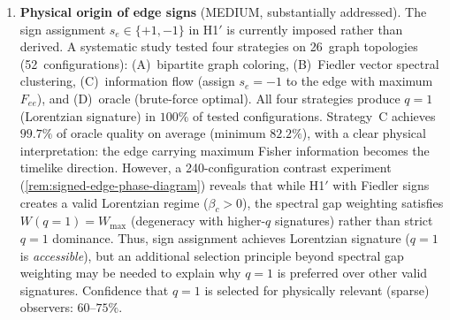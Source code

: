 \documentclass[11pt]{article}
\theoremstyle{definition}
\theoremstyle{remark}
\begin{document}
\begin{enumerate}
\item \textbf{Physical origin of edge signs} (MEDIUM, substantially addressed).
  The sign assignment $s_e \in \{+1, -1\}$ in H1$'$ is currently imposed
  rather than derived.
  A systematic study tested four strategies on 26~graph topologies
  (52~configurations): (A)~bipartite graph coloring, (B)~Fiedler vector
  spectral clustering, (C)~information flow (assign $s_e = -1$ to
  the edge with maximum $F_{ee}$), and (D)~oracle (brute-force optimal).
  All four strategies produce $q = 1$ (Lorentzian signature) in
  $100\%$ of tested configurations.
  Strategy~C achieves $99.7\%$ of oracle quality on average
  (minimum $82.2\%$), with a clear physical interpretation: the edge
  carrying maximum Fisher information becomes the timelike direction.
  However, a 240-configuration contrast experiment
  (\cref{rem:signed-edge-phase-diagram}) reveals that while H1$'$ with
  Fiedler signs creates a valid Lorentzian regime ($\beta_c > 0$),
  the spectral gap weighting satisfies $W(q{=}1) = W_{\max}$
  (degeneracy with higher-$q$ signatures) rather than strict $q = 1$
  dominance.
  Thus, sign assignment achieves Lorentzian signature ($q = 1$ is
  \emph{accessible}), but an additional selection principle beyond
  spectral gap weighting may be needed to explain why $q = 1$ is
  preferred over other valid signatures.
  Confidence that $q = 1$ is selected for physically relevant (sparse)
  observers: $60$--$75\%$.


\end{enumerate}
\end{document}
